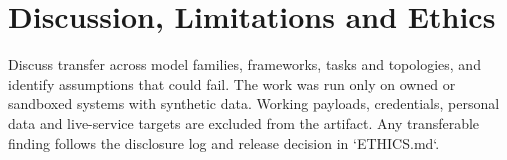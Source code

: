 \section{Discussion, Limitations and Ethics}
Discuss transfer across model families, frameworks, tasks and topologies, and identify assumptions that could fail.
The work was run only on owned or sandboxed systems with synthetic data. Working payloads, credentials, personal
data and live-service targets are excluded from the artifact. Any transferable finding follows the disclosure log
and release decision in `ETHICS.md`.
